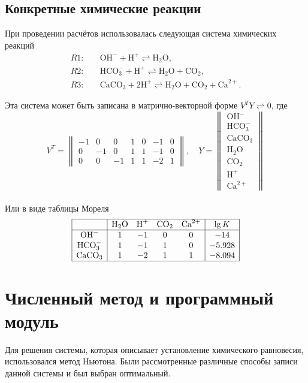 \documentclass[14pt,a4paper]{extarticle}
\begin{document}
\subsection{Конкретные химические реакции}

\newcommand{\OHm}{\text{OH}^-}
\newcommand{\Hp}{\text{H}^+}
\newcommand{\WAT}{\text{H}_2\text{O}}
\newcommand{\CARB}{\text{CO}_2}
\newcommand{\Catwop}{\text{Ca}^{2+}}
\newcommand{\Calcite}{\text{CaCO}_3}
\newcommand{\HCO}{\text{HCO}_3^{-}}
При проведении расчётов использовалась следующая система химических реакций
\begin{align*}
R1:&\quad \OHm + \Hp \rightleftharpoons \WAT,\\
R2:&\quad \HCO +\Hp \rightleftharpoons \WAT + \CARB,\\
R3:&\quad \Calcite + 2\Hp \rightleftharpoons \WAT + \CARB + \Catwop.
\end{align*}

Эта  система может быть записана в матрично-векторной форме $V^T Y \rightleftharpoons 0$, где
$$V^T =  \begin{Vmatrix}
-1 &0 &0  &1 &0 &-1 &0\\
0 &-1 &0  &1 &1 &-1 &0\\
0  &0 &-1  &1 &1 &-2 &1
		\end{Vmatrix}, \quad
  Y = \begin{Vmatrix}
  \OHm\\
  \HCO\\
  \Calcite\\
  \WAT\\
  \CARB\\
  \Hp\\
  \Catwop
  \end{Vmatrix}$$\\
Или в виде таблицы Мореля\\
$$\begin{array}{|c|cccc|c|}
\hline
		&\WAT	&\Hp	&\CARB	&\Catwop	&\lg {K}\\
\hline
\OHm		&1		&-1		&0		  &0		&-14\\
\HCO	&1		&-1		&1		  &0		&-5.928\\
\Calcite		&1		&-2		&1		  &1		&-8.094\\
\hline
\end{array}$$
\clearpage
\section{Численный метод и программный модуль}

Для решения системы, которая описывает установление химического равновесия, использовался метод Ньютона. Были рассмотренные различные способы записи данной системы и был выбран оптимальный.
\end{document}
